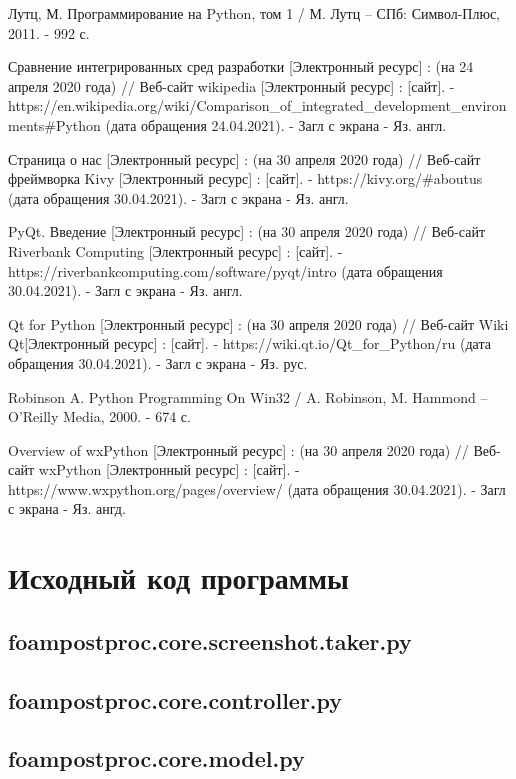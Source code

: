 \documentclass[14pt]{extreport}
\begin{document}
\begin{thebibliography}{9}
Лутц, М. Программирование на Python, том 1 / М. Лутц -- СПб: Символ-Плюс, 2011. - 992 с.

Сравнение интегрированных сред разработки [Электронный ресурс] : (на 24 апреля 2020 года) // Веб-сайт wikipedia [Электронный ресурс] : [сайт]. - https://en.wikipedia.org/wiki/Comparison\_of\_integrated\_development\_environments\#Python (дата обращения 24.04.2021). - Загл с экрана - Яз. англ.

Страница о нас [Электронный ресурс] : (на 30 апреля 2020 года) // Веб-сайт фреймворка Kivy [Электронный ресурс] : [сайт]. - https://kivy.org/\#aboutus (дата обращения 30.04.2021). - Загл с экрана - Яз. англ.

PyQt. Введение [Электронный ресурс] : (на 30 апреля 2020 года) // Веб-сайт Riverbank Computing [Электронный ресурс] : [сайт]. - https://riverbankcomputing.com/software/pyqt/intro (дата обращения 30.04.2021). - Загл с экрана - Яз. англ.

Qt for Python [Электронный ресурс] : (на 30 апреля 2020 года) // Веб-сайт Wiki Qt[Электронный ресурс] : [сайт]. - https://wiki.qt.io/Qt\_for\_Python/ru (дата обращения 30.04.2021). - Загл с экрана - Яз. рус.

Robinson A. Python Programming On Win32 / A. Robinson, M. Hammond -- O'Reilly Media, 2000. - 674 с.

Overview of wxPython [Электронный ресурс] : (на 30 апреля 2020 года) // Веб-сайт wxPython [Электронный ресурс] : [сайт]. - https://www.wxpython.org/pages/overview/ (дата обращения 30.04.2021). - Загл с экрана - Яз. ангд.

\end{thebibliography}


\Appendix
\chapter{Исходный код программы}
\section{foampostproc.core.screenshot.taker.py}

\section{foampostproc.core.controller.py}

\section{foampostproc.core.model.py}

\end{document}
